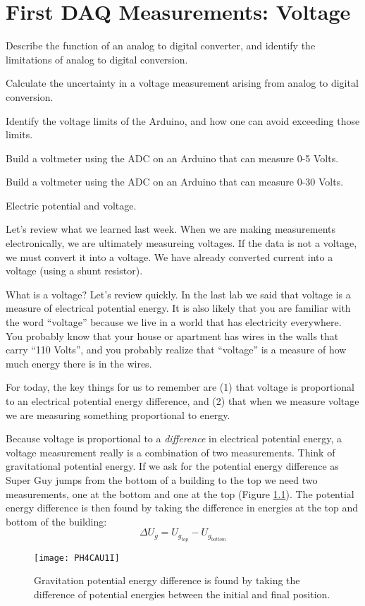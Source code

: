 \chapter{First DAQ Measurements: Voltage}

\objectives
{
\item Describe the function of an analog to digital converter, and identify the
	limitations of analog to digital conversion.
\item Calculate the uncertainty in a voltage measurement arising from analog
	to digital conversion.
\item Identify the voltage limits of the Arduino, and how one can avoid
	exceeding those limits.
\item Build a voltmeter using the ADC on an Arduino that can measure 0-5 Volts.
\item Build a voltmeter using the ADC on an Arduino that can measure 0-30 Volts.
}

\review
{
\item Electric potential and voltage.
}

Let's review what we learned last week. When we are making measurements
electronically, we are ultimately measureing voltages.
If the data is not a voltage, we must convert it into a
voltage. We have already converted current into a voltage (using a shunt
resistor). 

What is a voltage? Let's review quickly. 
In the last lab we said that voltage is a measure of
electrical potential energy. It is also likely that you are familiar with 
the word ``voltage'' because we live in a world that
has electricity everywhere. You probably know that your house or apartment
has wires in the walls that carry ``110
Volts'', and you probably realize that ``voltage'' 
is a measure of how much energy there is in the
wires.

For today, the key things for us to remember are (1) that voltage 
is proportional to an electrical potential
energy difference, and (2) that when we measure voltage we are
measuring something proportional to energy.

Because voltage is proportional to a \emph{difference} in electrical
potential energy, a voltage measurement really is a combination of two
measurements. Think of gravitational potential energy. If we ask for the
potential energy difference as Super Guy jumps from the bottom of a building
to the top 
we need two measurements, one at
the bottom and one at the top
(Figure \ref{fig:gravitational_energy_difference}). 
The potential energy difference is then found
by taking the difference in energies at the top and bottom of the building:
\begin{equation*}
\Delta U_{g}=U_{g_{top}}-U_{g_{bottom}}
\end{equation*}
\begin{figure}[htbp!]
\centering
\texttt{[image: PH4CAU1I]}
\caption[Gravitational potential energy difference.]{Gravitation potential
energy difference is found by taking the difference of potential energies 
between the initial and final position.}
\label{fig:gravitational_energy_difference}
\end{figure}

